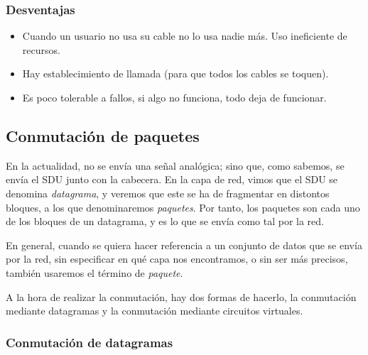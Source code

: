 \subsubsection{Desventajas}
\begin{itemize}
    \item Cuando un usuario no usa su cable no lo usa nadie más. Uso ineficiente de recursos.
    \item Hay establecimiento de llamada (para que todos los cables se toquen).
    \item Es poco tolerable a fallos, si algo no funciona, todo deja de funcionar.
\end{itemize}

\subsection{Conmutación de paquetes}
En la actualidad, no se envía una señal analógica; sino que, como sabemos, se envía el \acrshort{SDU} junto con la cabecera. En la capa de red, vimos que el \acrshort{SDU} se denomina \emph{datagrama}, y veremos que este se ha de fragmentar en distontos bloques, a los que denominaremos \emph{paquetes}. Por tanto, los paquetes son cada uno de los bloques de un datagrama, y es lo que se envía como tal por la red.
\begin{observacion}
    En general, cuando se quiera hacer referencia a un conjunto de datos que se envía por la red, sin especificar en qué capa nos encontramos, o sin ser más precisos, también usaremos el término de \emph{paquete}.
\end{observacion}

A la hora de realizar la conmutación, hay dos formas de hacerlo, la conmutación mediante datagramas y la conmutación mediante circuitos virtuales.

\subsubsection{Conmutación de datagramas}

